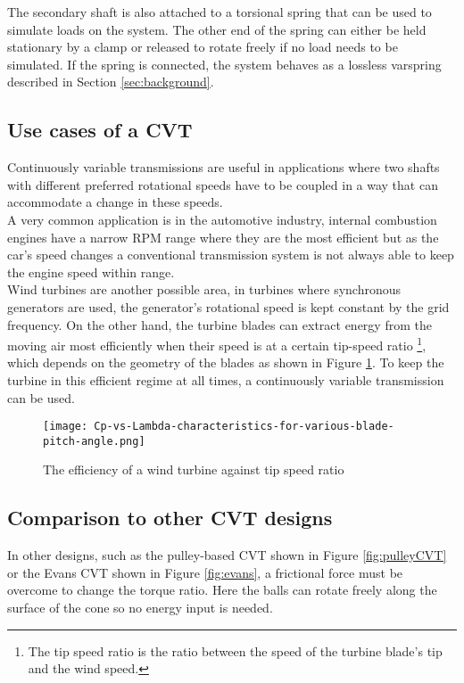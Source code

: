 \documentclass[12pt]{article}
\begin{document}
The secondary shaft is also attached to a torsional spring that can be used to simulate loads on the system. The other end of the spring can either be held stationary by a clamp or released to rotate freely if no load needs to be simulated. If the spring is connected, the system behaves as a lossless varspring described in Section \ref{sec:background}.\\





\subsection{Use cases of a CVT}
Continuously variable transmissions are useful in applications where two shafts with different preferred rotational speeds have to be coupled in a way that can accommodate a change in these speeds.\\

A very common application is in the automotive industry, internal combustion engines have a narrow RPM range where they are the most efficient but as the car's speed changes a conventional transmission system is not always able to keep the engine speed within range.\\

Wind turbines are another possible area, in turbines where synchronous generators are used, the generator's rotational speed is kept constant by the grid frequency. On the other hand, the turbine blades can extract energy from the moving air most efficiently when their speed is at a certain tip-speed ratio \footnote{The tip speed ratio is the ratio between the speed of the turbine blade's tip and the wind speed.}, which depends on the geometry of the blades as shown in Figure \ref{fig:windTurbine}. To keep the turbine in this efficient regime at all times, a continuously variable transmission can be used.


\begin{figure}
    \centering
    \texttt{[image: Cp-vs-Lambda-characteristics-for-various-blade-pitch-angle.png]}
    \caption{The efficiency of a wind turbine against tip speed ratio \cite{wind}}
    \label{fig:windTurbine}
\end{figure}


\subsection{Comparison to other CVT designs}
In other designs, such as the pulley-based CVT shown in Figure \ref{fig:pulleyCVT} or the Evans CVT \cite{evans} shown in Figure \ref{fig:evans}, a frictional force must be overcome to change the torque ratio. Here the balls can rotate freely along the surface of the cone so no energy input is needed.\\
\end{document}
